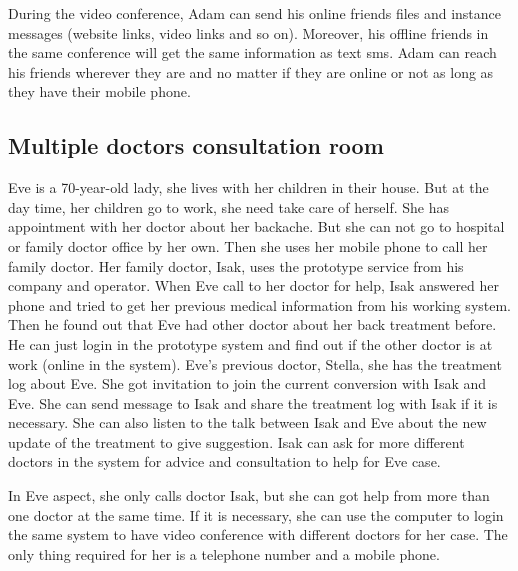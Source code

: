 \par During the video conference, Adam can send his online friends files and instance messages (website links, video links and so on). Moreover, his offline friends in the same conference will get the same information as text \gls{sms}. Adam can reach his friends wherever they are and no matter if they are online or not as long as they have their mobile phone. 

\subsection{Multiple doctors consultation room}

\par Eve is a 70-year-old lady, she lives with her children in their house. But at the day time, her children go to work, she need take care of herself. She has appointment with her doctor about her backache. But she can not go to hospital or family doctor office by her own. Then she uses her mobile phone to call her family doctor. Her family doctor, Isak, uses the prototype service from his company and operator. When Eve call to her doctor for help, Isak answered her phone and tried to get her previous medical information from his working system. Then he found out that Eve had other doctor about her back treatment before. He can just login in the prototype system and find out if the other doctor is at work (online in the system). Eve's previous doctor, Stella, she has the treatment log about Eve. She got invitation to join the current conversion with Isak and Eve. She can send message to Isak and share the treatment log with Isak if it is necessary. She can also listen to the talk between Isak and Eve about the new update of the treatment to give suggestion. Isak can ask for more different doctors in the system for advice and consultation to help for Eve case.

\par In Eve aspect, she only calls doctor Isak, but she can got help from more than one doctor at the same time. If it is necessary, she can use the computer to login the same system to have video conference with different doctors for her case. The only thing required for her is a telephone number and a mobile phone.